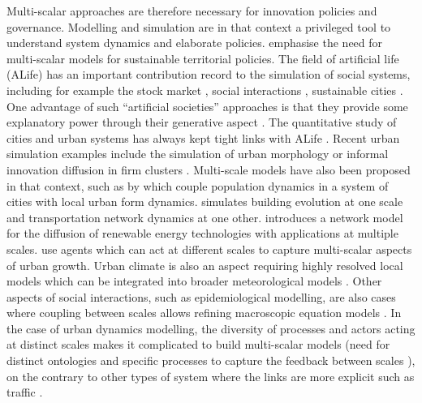 \documentclass[letterpaper]{article}
\begin{document}
Multi-scalar approaches are therefore necessary for innovation policies and governance. Modelling and simulation are in that context a privileged tool to understand system dynamics and elaborate policies. \cite{rozenblat2018conclusion} emphasise the need for multi-scalar models for sustainable territorial policies. The field of artificial life (ALife) has an important contribution record to the simulation of social systems, including for example the stock market \citep{palmer1994artificial}, social interactions \citep{sawyer2003artificial}, sustainable cities \citep{wang2004artificial}. One advantage of such ``artificial societies'' approaches is that they provide some explanatory power through their generative aspect \citep{grune2009explanatory}. The quantitative study of cities and urban systems has always kept tight links with ALife \citep{raimbault2020cities}. Recent urban simulation examples include the simulation of urban morphology \citep{raimbault2019generating} or informal innovation diffusion in firm clusters \citep{raimbault2022innovation}. Multi-scale models have also been proposed in that context, such as by \cite{raimbault2021strong} which couple population dynamics in a system of cities with local urban form dynamics. \cite{raimbault2021multiscale} simulates building evolution at one scale and transportation network dynamics at one other. \cite{rojas2021sustainability} introduces a network model for the diffusion of renewable energy technologies with applications at multiple scales. \cite{torrens2012polyspatial} use agents which can act at different scales to capture multi-scalar aspects of urban growth. Urban climate is also an aspect requiring highly resolved local models which can be integrated into broader meteorological models \citep{mauree2018multi}. Other aspects of social interactions, such as epidemiological modelling, are also cases where coupling between scales allows refining macroscopic equation models \citep{banos2015importance}. In the case of urban dynamics modelling, the diversity of processes and actors acting at distinct scales makes it complicated to build multi-scalar models (need for distinct ontologies and specific processes to capture the feedback between scales \citep{raimbault2021strong}), on the contrary to other types of system where the links are more explicit such as traffic \citep{banos2017multiscale}.
\end{document}

